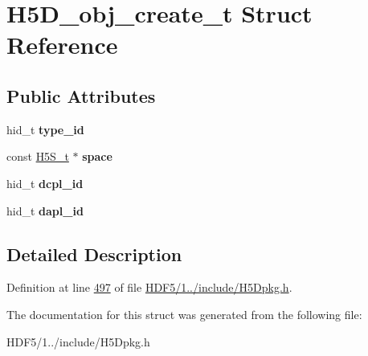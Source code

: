 \hypertarget{struct_h5_d__obj__create__t}{}\section{H5\+D\+\_\+obj\+\_\+create\+\_\+t Struct Reference}
\label{struct_h5_d__obj__create__t}
\subsection*{Public Attributes}
\begin{DoxyCompactItemize}
\item 
\mbox{\label{struct_h5_d__obj__create__t_a9b56fcff58ff6d0af8dfe4139def6669}} 
hid\+\_\+t {\bfseries type\+\_\+id}
\item 
\mbox{\label{struct_h5_d__obj__create__t_ad3661761b098b1ecd3710c00ac119b57}} 
const \hyperlink{struct_h5_s__t}{H5\+S\+\_\+t} $\ast$ {\bfseries space}
\item 
\mbox{\label{struct_h5_d__obj__create__t_aeb319005fcc9e8f48f34a7594ab3985e}} 
hid\+\_\+t {\bfseries dcpl\+\_\+id}
\item 
\mbox{\label{struct_h5_d__obj__create__t_a86b6e97981d0c489f08e227a9e713ef8}} 
hid\+\_\+t {\bfseries dapl\+\_\+id}
\end{DoxyCompactItemize}


\subsection{Detailed Description}


Definition at line \hyperlink{_h_d_f5_21_810_81_2include_2_h5_dpkg_8h_source_l00497}{497} of file \hyperlink{_h_d_f5_21_810_81_2include_2_h5_dpkg_8h_source}{H\+D\+F5/1../include/\+H5\+Dpkg.\+h}.



The documentation for this struct was generated from the following file\+:\begin{DoxyCompactItemize}
\item 
H\+D\+F5/1../include/\+H5\+Dpkg.\+h\end{DoxyCompactItemize}
